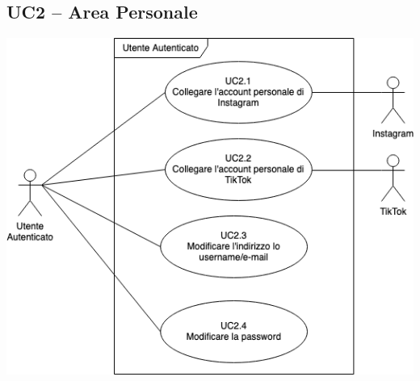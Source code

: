 \subsection{UC2 – Area Personale}
\begin{center}
\includegraphics[scale=0.5]{UC_images/UC2.png}
\end{center}
